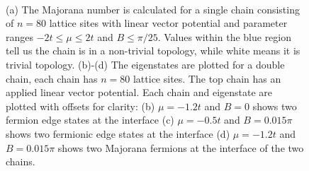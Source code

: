 \documentclass[aps,prb,showpacs,amsmath,amssymb,superscriptaddress]{revtex4-2}
\begin{document}
\begin{figure}[]
  \\
\caption{(a) The Majorana number is calculated for a single chain consisting of $n=80$ lattice sites with linear vector potential and parameter ranges $-2t \leq \mu \leq 2t$ and $B\leq \pi/25$. Values within the blue region tell us the chain is in a non-trivial topology, while white means it is trivial topology. (b)-(d) The eigenstates are plotted for a double chain, each chain has $n=80$ lattice sites. The top chain has an applied linear vector potential. Each chain and eigenstate are plotted with offsets for clarity: (b) $\mu=-1.2t$ and $B=0$ shows two fermion edge states at the interface (c) $\mu=-0.5t$ and $B=0.015\pi$ shows two fermionic edge states at the interface (d) $\mu=-1.2t$ and $B=0.015\pi$ shows two Majorana fermions at the interface of the two chains.}
\label{fig:majorana-number}
\end{figure}
\end{document}
